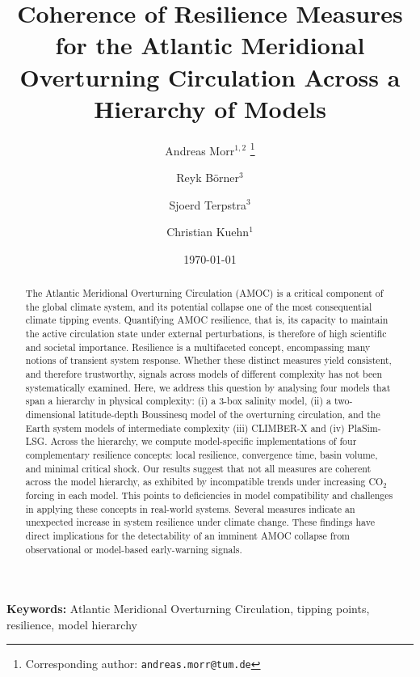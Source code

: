 \documentclass[12pt, a4paper]{article}
\newcommand{\CO}{CO\ensuremath{_2}}
\begin{document}
\title{Coherence of Resilience Measures for the Atlantic Meridional
       Overturning Circulation Across a Hierarchy of Models}

\author{Andreas Morr$^{1,2}$%
\thanks{Corresponding author: \texttt{andreas.morr@tum.de}}
\and
Reyk Börner$^{3}$
\and
Sjoerd Terpstra$^{3}$
\and
Christian Kuehn$^{1}$}


\date{\today}
\maketitle

\begin{abstract}
The Atlantic Meridional Overturning Circulation (AMOC) is a critical component of the global climate system, and its potential collapse one of the most consequential climate tipping events. Quantifying AMOC resilience, that is, its capacity to maintain the active circulation state under external perturbations, is therefore of high scientific and societal importance. Resilience is a multifaceted concept, encompassing many notions of transient system response. Whether these distinct measures yield consistent, and therefore trustworthy, signals across models of different complexity has not been systematically examined. Here, we address this question by analysing four models that span a hierarchy in physical complexity: (i) a 3-box salinity model, (ii) a two-dimensional latitude-depth Boussinesq model of the overturning circulation, and the Earth system models of intermediate complexity (iii) CLIMBER-X and (iv) PlaSim-LSG. Across the hierarchy, we compute model-specific implementations of four complementary resilience concepts: local resilience, convergence time, basin volume, and minimal critical shock. Our results suggest that not all measures are coherent across the model hierarchy, as exhibited by incompatible trends under increasing \CO{} forcing in each model. This points to deficiencies in model compatibility and challenges in applying these concepts in real-world systems. Several measures indicate an unexpected increase in system resilience under climate change. These findings have direct implications for the detectability of an imminent AMOC collapse from observational or model-based early-warning signals.

\end{abstract}

\textbf{Keywords:} Atlantic Meridional Overturning Circulation, tipping points, resilience, model hierarchy

\newpage
\end{document}
